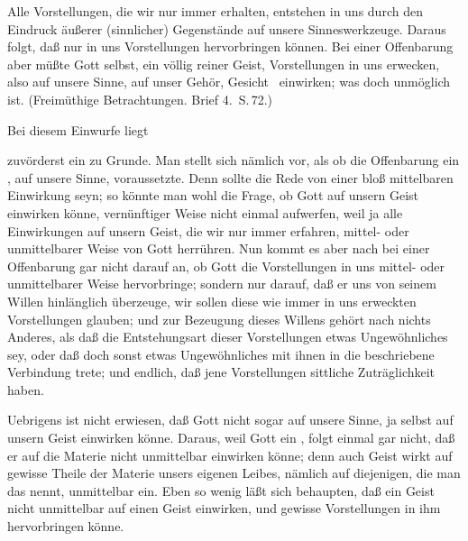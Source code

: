 Alle Vorstellungen, die wir nur immer erhalten, entstehen in uns durch den Eindruck äußerer (sinnlicher) Gegenstände auf unsere Sinneswerkzeuge. Daraus folgt, daß nur  in uns Vorstellungen hervorbringen können. Bei einer Offenbarung aber müßte Gott selbst, ein völlig reiner Geist, Vorstellungen in uns erwecken, also auf unsere Sinne, auf unser Gehör, Gesicht \usw\ einwirken; was doch unmöglich ist. (Freimüthige Betrachtungen. Brief 4.\ S.\,72.)\par
{} Bei diesem Einwurfe liegt
\begin{aufzb}
\item zuvörderst ein  zu Grunde. Man stellt sich nämlich vor, als ob die Offenbarung ein , auf unsere Sinne, voraussetzte. Denn sollte die Rede von einer bloß mittelbaren Einwirkung seyn; so könnte man wohl die Frage, ob Gott auf unsern Geist einwirken könne, vernünftiger Weise nicht einmal aufwerfen, weil ja alle Einwirkungen auf unsern Geist, die wir nur immer erfahren, mittel- oder unmittelbarer Weise von Gott herrühren. Nun kommt es aber nach  bei einer Offenbarung gar nicht darauf an, ob Gott die Vorstellungen in uns mittel- oder unmittelbarer Weise hervorbringe; sondern nur darauf, daß er uns von seinem Willen hinlänglich überzeuge, wir sollen diese wie immer in uns erweckten Vorstellungen glauben; und zur Bezeugung dieses Willens gehört nach  nichts Anderes, als daß die Entstehungsart dieser Vorstellungen etwas Ungewöhnliches sey, oder daß doch sonst etwas Ungewöhnliches mit ihnen in die  beschriebene Verbindung trete; und endlich, daß jene Vorstellungen sittliche Zuträglichkeit haben.
\item Uebrigens ist nicht erwiesen, daß Gott nicht sogar  auf unsere Sinne, ja selbst auf unsern Geist einwirken könne. Daraus, weil Gott ein , folgt einmal gar nicht, daß er auf die Materie nicht unmittelbar einwirken könne; denn auch  Geist wirkt auf gewisse Theile der Materie unsers eigenen Leibes, nämlich auf diejenigen, die man das  nennt, unmittelbar ein. Eben so wenig läßt sich behaupten, daß ein Geist nicht unmittelbar auf einen  Geist einwirken, und gewisse Vorstellungen in ihm hervorbringen könne.~
\end{aufzb}

